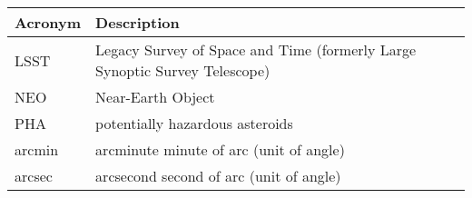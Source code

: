 \addtocounter{table}{-1}
\begin{longtable}{p{}p{}}\hline
\textbf{Acronym} & \textbf{Description}  \\\hline

LSST & Legacy Survey of Space and Time (formerly Large Synoptic Survey Telescope) \\\hline
NEO & Near-Earth Object \\\hline
PHA & potentially hazardous asteroids \\\hline
arcmin & arcminute minute of arc (unit of angle) \\\hline
arcsec & arcsecond second of arc (unit of angle) \\\hline
\end{longtable}
